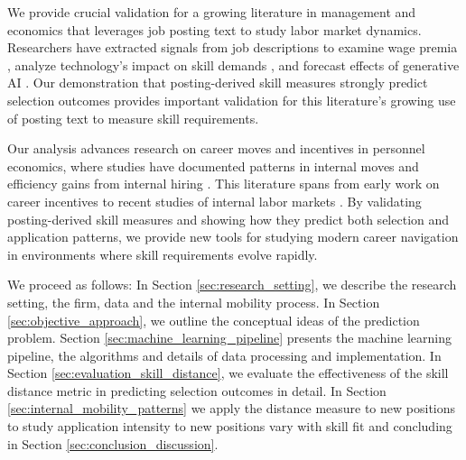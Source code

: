 We provide crucial validation for a growing literature in management and economics that leverages job posting text 
to study labor market dynamics. Researchers have extracted signals from job descriptions to examine wage premia 
\citep{Bana2021}, analyze technology's impact on skill demands \citep{George2024}, and forecast effects of 
generative AI \citep{eloundou2024gpts, 2024_Acemoglu}. Our demonstration that posting-derived skill measures 
strongly predict selection outcomes provides important validation for this literature's growing use of posting 
text to measure skill requirements.

Our analysis advances research on career moves and incentives in personnel economics, where studies have documented 
patterns in internal moves \citep{bidwell2024stepping} and efficiency gains from internal hiring \citep{bidwell2011paying}. 
This literature spans from early work on career incentives \citep{baker1994internal, baker1994wage} to recent studies 
of internal labor markets \citep{tambe2020paying, huitfeldt2023internal}. By validating posting-derived skill measures 
and showing how they predict both selection and application patterns, we provide new tools for studying modern career 
navigation in environments where skill requirements evolve rapidly.

We proceed as follows: In Section \ref{sec:research_setting}, we describe the research setting, the 
firm, data and the internal mobility process. In Section \ref{sec:objective_approach}, we outline 
the conceptual ideas of the prediction problem. Section \ref{sec:machine_learning_pipeline} presents 
the machine learning pipeline, the algorithms and details of data processing and implementation. In 
Section \ref{sec:evaluation_skill_distance}, we evaluate the effectiveness of the skill distance metric 
in predicting selection outcomes in detail. In Section \ref{sec:internal_mobility_patterns} we apply 
the distance measure to new positions to study application intensity to new positions vary with skill 
fit and concluding in Section \ref{sec:conclusion_discussion}.


